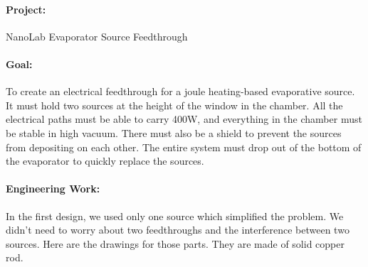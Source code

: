 \documentclass[12pt]{report}
\begin{document}
\paragraph{Project:} NanoLab Evaporator Source Feedthrough
\paragraph{Goal:} To create an electrical feedthrough for a joule heating-based evaporative source. It must hold two sources at the height of the window in the chamber. All the electrical paths must be able to carry 400W, and everything in the chamber must be stable in high vacuum. There must also be a shield to prevent the sources from depositing on each other. The entire system must drop out of the bottom of the evaporator to quickly replace the sources.

\paragraph{Engineering Work:}
In the first design, we used only one source which simplified the problem. We didn't need to worry about two feedthroughs and the interference between two sources. Here are the drawings for those parts. They are made of solid copper rod.
\end{document}
